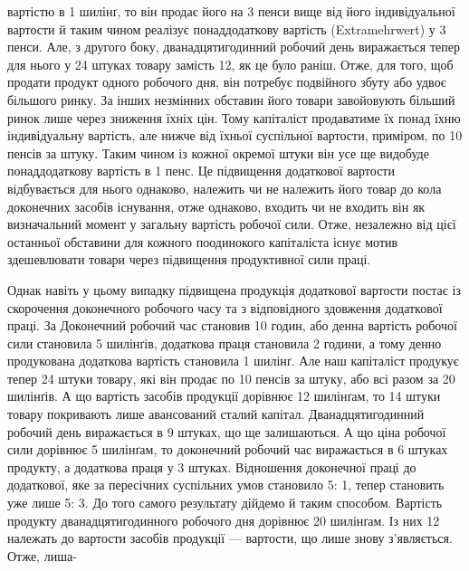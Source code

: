 \parcont{}  %
вартістю в 1 шилінґ, то він продає його на 3 пенси вище від його
індивідуальної вартости й таким чином реалізує понаддодаткову
вартість (Extramehrwert) у 3 пенси. Але, з другого боку, дванадцятигодинний
робочий день виражається тепер для нього у
24 штуках товару замість 12, як це було раніш. Отже, для
того, щоб продати продукт одного робочого дня, він потребує
подвійного збуту або удвоє більшого ринку. За інших незмінних
обставин його товари завойовують більший ринок лише через
зниження їхніх цін. Тому капіталіст продаватиме їх понад їхню
індивідуальну вартість, але нижче від їхньої суспільної вартости,
приміром, по 10 пенсів за штуку. Таким чином із кожної окремої
штуки він усе ще видобуде понаддодаткову вартість в 1 пенс. Це
підвищення додаткової вартости відбувається для нього однаково,
належить чи не належить його товар до кола доконечних
засобів існування, отже однаково, входить чи не входить він як
визначальний момент у загальну вартість робочої сили. Отже,
незалежно від цієї останньої обставини для кожного поодинокого
капіталіста існує мотив здешевлювати товари через підвищення
продуктивної сили праці.

Однак навіть у цьому випадку підвищена продукція додаткової
вартости постає із скорочення доконечного робочого часу та
з відповідного здовження додаткової праці. За  Доконечний робочий
час становив 10 годин, або денна вартість робочої сили становила
5 шилінґів, додаткова праця становила 2 години, а тому
денно продукована додаткова вартість становила 1 шилінґ. Але
наш капіталіст продукує тепер 24 штуки товару, які він продає
по 10 пенсів за штуку, або всі разом за 20 шилінґів. А що вартість
засобів продукції дорівнює 12 шилінґам, то 14 штуки товару
покривають лише авансований сталий капітал. Дванадцятигодинний
робочий день виражається в 9 штуках, що ще залишаються.
А що ціна робочої сили дорівнює 5 шилінґам, то доконечний робочий
час виражається в 6 штуках продукту, а додаткова праця
у 3 штуках. Відношення доконечної праці до додаткової, яке за
пересічних суспільних умов становило 5: 1, тепер становить
уже лише 5: 3. До того самого результату дійдемо й таким способом.
Вартість продукту дванадцятигодинного робочого дня
дорівнює 20 шилінґам. Із них 12 належать до вартости засобів
продукції — вартости, що лише знову з’являється. Отже, лиша-

